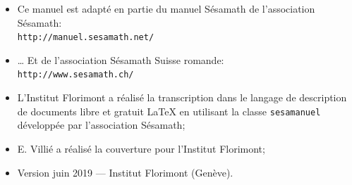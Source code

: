 \documentclass[TS]{sesamanuel}
\begin{document}
\vfill


\newpage


\begin{prerequis}
\begin{itemize}
\item  Ce manuel est adapté en partie du manuel Sésamath de l'association Sésamath:\\
\texttt{http://manuel.sesamath.net/}
\item … Et de l'association Sésamath Suisse romande:\\ \texttt{http://www.sesamath.ch/}
\item L'Institut Florimont a réalisé la transcription dans le langage de description de documents libre et gratuit \LaTeX{} en utilisant la classe \texttt{sesamanuel} développée par l'association Sésamath;
\item E. Villié a réalisé la couverture pour l'Institut Florimont;
\item Version juin 2019 --- Institut Florimont (Genève).
\end{itemize}
 \end{prerequis}

\vspace{10em}





\setcounter{chapter}{0}

\setcounter{page}{6}

\themaC


\themaG


\themaC


\themaC


\themaG


\themaC


\themaG


\themaC


\themaC


\themaG


\end{document}
